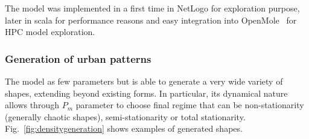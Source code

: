 The model was implemented in a first time in NetLogo for exploration purpose, later in scala for performance reasons and easy integration into OpenMole~\cite{reuillon2013openmole} for HPC model exploration.


\subsubsection{Generation of urban patterns}



The model as few parameters but is able to generate a very wide variety of shapes, extending beyond existing forms. In particular, its dynamical nature allows through $P_m$ parameter to choose final regime that can be non-stationarity (generally chaotic shapes), semi-stationarity or total stationarity. Fig.~\ref{fig:densitygeneration} shows examples of generated shapes.



